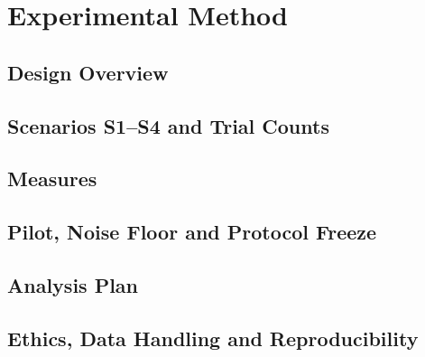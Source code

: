 \chapter{Experimental Method}\label{ch:method}
\section{Design Overview}
\section{Scenarios S1--S4 and Trial Counts}
\section{Measures}
\section{Pilot, Noise Floor and Protocol Freeze}
\section{Analysis Plan}
\section{Ethics, Data Handling and Reproducibility}
